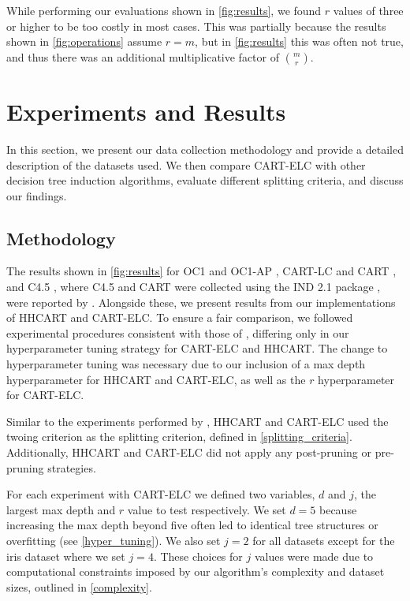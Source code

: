 \documentclass[10pt]{article} %
\begin{document}
While performing our evaluations shown in \autoref{fig:results}, we found $r$ values of three or higher to be too costly in most cases. This was partially because the results shown in \autoref{fig:operations} assume $r=m$, but in \autoref{fig:results} this was often not true, and thus there was an additional multiplicative factor of $\binom{m}{r}$.

\section{Experiments and Results}

In this section, we present our data collection methodology and provide a detailed description of the datasets used. We then compare CART-ELC with other decision tree induction algorithms, evaluate different splitting criteria, and discuss our findings.

\subsection{Methodology}\label{methodology}

The results shown in \autoref{fig:results} for OC1 and OC1-AP \citep{MurthyKS94}, CART-LC and CART \citep{breiman1984cart}, and C4.5 \citep{c4.5}, where C4.5 and CART were collected using the IND 2.1 package \citep{buntine}, were reported by \citet{MurthyKS94}. Alongside these, we present results from our implementations of HHCART \citep{HHCart} and CART-ELC.%
\makeatletter
{}%
%
\makeatother
\space To ensure a fair comparison, we followed experimental procedures consistent with those of \citet{MurthyKS94}, differing only in our hyperparameter tuning strategy for CART-ELC and HHCART. The change to hyperparameter tuning was necessary due to our inclusion of a max depth hyperparameter for HHCART and CART-ELC, as well as the $r$ hyperparameter for CART-ELC.

Similar to the experiments performed by \citet{MurthyKS94}, HHCART and CART-ELC used the twoing criterion as the splitting criterion, defined in \autoref{splitting_criteria}. Additionally, HHCART and CART-ELC did not apply any post-pruning or pre-pruning strategies.
 
For each experiment with CART-ELC we defined two variables, $d$ and $j$, the largest max depth and $r$ value to test respectively. We set $d = 5$ because increasing the max depth beyond five often led to identical tree structures or overfitting (see \autoref{hyper_tuning}). We also set $j = 2$ for all datasets except for the iris dataset where we set $j = 4$. These choices for $j$ values were made due to computational constraints imposed by our algorithm's complexity and dataset sizes, outlined in \autoref{complexity}. 
\end{document}
